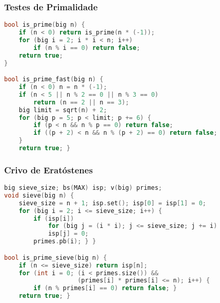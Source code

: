 \subsubsection{Testes de Primalidade}
\begin{lstlisting}[language=C++]
bool is_prime(big n) {
    if (n < 0) return is_prime(n * (-1));
    for (big i = 2; i * i < n; i++)
        if (n % i == 0) return false;
    return true;
}

bool is_prime_fast(big n) {
    if (n < 0) n = n * (-1);
    if (n < 5 || n % 2 == 0 || n % 3 == 0)
        return (n == 2 || n == 3);
    big limit = sqrt(n) + 2;
    for (big p = 5; p < limit; p += 6) {
        if (p < n && n % p == 0) return false;
        if ((p + 2) < n && n % (p + 2) == 0) return false;
    }
    return true; }
\end{lstlisting}

\subsubsection{Crivo de Eratóstenes}
\begin{lstlisting}[language=C++]
big sieve_size; bs(MAX) isp; v(big) primes;
void sieve(big n) {
    sieve_size = n + 1; isp.set(); isp[0] = isp[1] = 0;
    for (big i = 2; i <= sieve_size; i++) {
        if (isp[i])
            for (big j = (i * i); j <= sieve_size; j += i)
            isp[j] = 0;
        primes.pb(i); } }

bool is_prime_sieve(big n) {
    if (n <= sieve_size) return isp[n];
    for (int i = 0; (i < primes.size()) && 
                    (primes[i] * primes[i] <= n); i++) {
        if (n % primes[i] == 0) return false; }
    return true; }
\end{lstlisting}

\newpage

